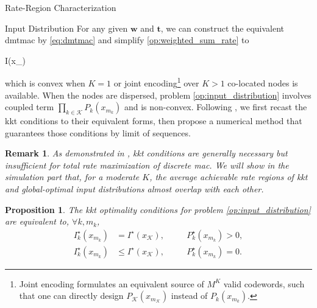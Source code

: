 \documentclass[journal]{IEEEtran}
\newtheorem{proposition}{Proposition}
\newtheorem{remark}{Remark}
\begin{document}
\begin{section}{Rate-Region Characterization}
	\begin{subsection}{Input Distribution}
		For any given $\boldsymbol{w}$ and $\boldsymbol{t}$, we can construct the equivalent \gls{dmtmac} by \eqref{eq:dmtmac} and simplify \eqref{op:weighted_sum_rate} to
		\begin{maxi!}
			{}{I(x_{})}{\label{op:input_distribution}}{}
			\addConstraint{\eqref{co:sum_probability},\eqref{co:nonnegative_probability},}
		\end{maxi!}
		which is convex when $K=1$ or joint encoding\footnote{Joint encoding formulates an equivalent source of $M^K$ valid codewords, such that one can directly design $P_{\mathcal{K}}(x_{m_{\mathcal{K}}})$ instead of $P_k(x_{m_k})$.} over $K>1$ co-located nodes is available.
		When the nodes are dispersed, problem \eqref{op:input_distribution} involves coupled term $\prod_{k \in \mathcal{K}} P_k(x_{m_k})$ and is non-convex.
		Following \cite{Rezaeian2004}, we first recast the \gls{kkt} conditions to their equivalent forms, then propose a numerical method that guarantees those conditions by limit of sequences.
		\begin{remark}
			As demonstrated in \cite{Buhler2011}, \gls{kkt} conditions are generally necessary but insufficient for total rate maximization of discrete \gls{mac}.
			We will show in the simulation part that, for a moderate $K$, the average achievable rate regions of \gls{kkt} and global-optimal input distributions almost overlap with each other.
			\label{re:input_kkt_distribution}
		\end{remark}
		\begin{proposition}
			The \gls{kkt} optimality conditions for problem \eqref{op:input_distribution} are equivalent to, $\forall k,m_k$,
			\begin{subequations}
				\label{eq:input_kkt_condition}
				\begin{alignat}{2}
					I_k^\star(x_{m_k}) & = I^\star(x_{\mathcal{K}}), \quad   &  & P_k^\star(x_{m_k}) > 0,\label{eq:probable_states} \\
					I_k^\star(x_{m_k}) & \le I^\star(x_{\mathcal{K}}), \quad &  & P_k^\star(x_{m_k}) = 0.\label{eq:dropped_states}
				\end{alignat}
			\end{subequations}
			\label{pr:input_kkt_condition}
		\end{proposition}


\end{subsection}
\end{section}
\end{document}
